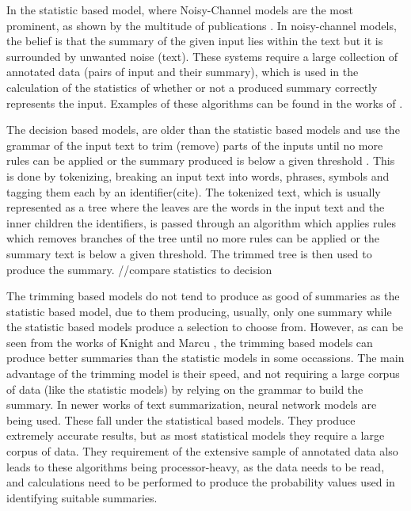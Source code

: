 \par In the statistic based model, where Noisy-Channel models are the most prominent, as shown by the multitude of publications \cite{daumemarcu2002,rushchopraweston2015,chopraaulirush2016}. In noisy-channel models, the belief is that the summary of the given input lies within the text but it is surrounded by unwanted noise (text). These systems require a large collection of annotated data (pairs of input and their summary), which is used in the calculation of the statistics of whether or not a produced summary correctly represents the input. Examples of these algorithms can be found in the works of \cite{daumemarcu2002,knightmarcu2000}.
\par The decision based models, are older than the statistic based models and use the grammar of the input text to trim (remove) parts of the inputs until no more rules can be applied or the summary produced is below a given threshold \cite{dorrzajicschwartz2003}. This is done by tokenizing, breaking an input text into words, phrases, symbols and tagging them each by an identifier(cite). The tokenized text, which is usually represented as a tree where the leaves are the words in the input text and the inner children the identifiers, is passed through an algorithm which applies rules which removes branches of the tree until no more rules can be applied or the summary text is below a given threshold. The trimmed tree is then used to produce the summary.
//compare statistics to decision
\par The trimming based models do not tend to produce as good of summaries as the statistic based model, due to them producing, usually, only one summary while the statistic based models produce a selection to choose from. However, as can be seen from the works of Knight and Marcu \cite{knightmarcu2000}, the trimming based models can produce better summaries than the statistic models in some occassions. The main advantage of the trimming model is their speed, and not requiring a large corpus of data (like the statistic models) by relying on the grammar to build the summary. In newer works of text summarization, neural network models are being used. These fall under the statistical based models. They produce extremely accurate results, but as most statistical models they require a large corpus of data. They requirement of the extensive sample of annotated data also leads to these algorithms being processor-heavy, as the data needs to be read, and calculations need to be performed to produce the probability values used in identifying suitable summaries.
